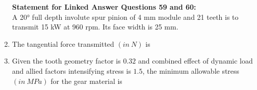 \documentclass[journal]{IEEEtran}
\begin{document}
\begin{enumerate}[leftmargin=0pt]
\textbf{Statement for Linked Answer Questions 59 and 60:}\\
A 20° full depth involute spur pinion of 4 mm module and 21 teeth is to transmit 15 kW at 960 rpm. Its face width is 25 mm.
\item The tangential force transmitted $(in\  N)$ is
\begin{enumerate}
\end{enumerate}

\item Given the tooth geometry factor is $0.32$ and combined effect of dynamic load and allied factors intensifying stress is $1.5$, the minimum allowable stress $(in\  MPa)$ for the gear material is
\begin{enumerate}
\hfill{}
\end{enumerate}



\end{enumerate}
\end{document}
